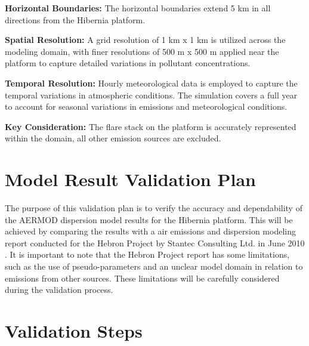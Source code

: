 \noindent \textbf{Horizontal Boundaries:} The horizontal boundaries extend 5 km in all directions from the Hibernia platform. 


\noindent \textbf{Spatial Resolution:} A grid resolution of 1 km x 1 km is utilized across the modeling domain, with finer resolutions of 500 m x 500 m applied near the platform to capture detailed variations in pollutant concentrations.

\noindent \textbf{Temporal Resolution:} Hourly meteorological data is employed to capture the temporal variations in atmospheric conditions. The simulation covers a full year to account for seasonal variations in emissions and meteorological conditions.

\noindent \textbf{Key Consideration:} The flare stack on the platform is accurately represented within the domain, all other emission sources are excluded.

\section*{Model Result Validation Plan}
The purpose of this validation plan is to verify the accuracy and dependability of the AERMOD dispersion model results for the Hibernia platform. This will be achieved by comparing the results with a  air emissions and dispersion modeling report conducted for the Hebron Project by Stantec Consulting Ltd. in June 2010 \cite{Hebron2010}. It is important to note that the Hebron Project report has some limitations, such as the use of pseudo-parameters and an unclear model domain in relation to emissions from other sources. These limitations will be carefully considered during the validation process.

\section*{Validation Steps}

